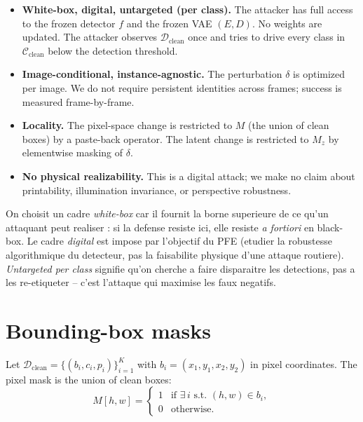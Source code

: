 \documentclass[11pt,a4paper]{article}
\begin{document}
\begin{itemize}[leftmargin=*, itemsep=2pt]
\item \textbf{White-box, digital, untargeted (per class).} The attacker has full
access to the frozen detector $f$ and the frozen VAE $(E, D)$. No weights are
updated. The attacker observes $\mathcal{D}_{\text{clean}}$ once and tries to
drive every class in $\mathcal{C}_{\text{clean}}$ below the detection threshold.
\item \textbf{Image-conditional, instance-agnostic.} The perturbation $\delta$
is optimized per image. We do not require persistent identities across frames;
success is measured frame-by-frame.
\item \textbf{Locality.} The pixel-space change is restricted to $M$ (the
union of clean boxes) by a paste-back operator. The latent change is restricted
to $M_z$ by elementwise masking of $\delta$.
\item \textbf{No physical realizability.} This is a digital attack; we make no
claim about printability, illumination invariance, or perspective robustness.
\end{itemize}

\begin{supervisornote}
On choisit un cadre \emph{white-box} car il fournit la borne superieure de
ce qu'un attaquant peut realiser : si la defense resiste ici, elle resiste
\emph{a fortiori} en black-box. Le cadre \emph{digital} est impose par
l'objectif du PFE (etudier la robustesse algorithmique du detecteur, pas la
faisabilite physique d'une attaque routiere). \emph{Untargeted per class}
signifie qu'on cherche a faire disparaitre les detections, pas a les
re-etiqueter -- c'est l'attaque qui maximise les faux negatifs.
\end{supervisornote}

\section{Bounding-box masks}\label{sec:masks}

Let $\mathcal{D}_{\text{clean}} = \{ (b_i, c_i, p_i) \}_{i=1}^{K}$ with
$b_i = (x_1, y_1, x_2, y_2)$ in pixel coordinates. The pixel mask is the
union of clean boxes:
\begin{equation}
M[h, w] = \begin{cases}
1 & \text{if } \exists\, i \text{ s.t. } (h, w) \in b_i, \\
0 & \text{otherwise.}
\end{cases}
\end{equation}
\end{document}
